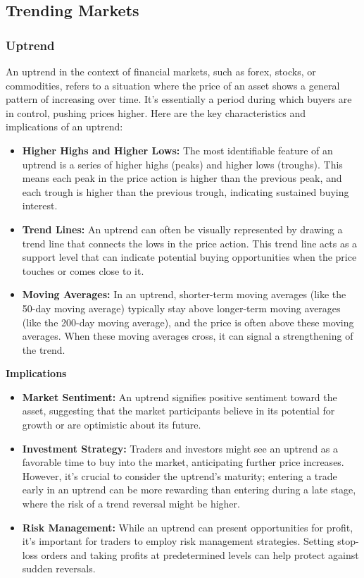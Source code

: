 \documentclass{report}
\begin{document}
    \bigbreak \noindent 
    \subsection{Trending Markets}
    \bigbreak \noindent 
    \subsubsection{Uptrend}
    \bigbreak \noindent 
    An uptrend in the context of financial markets, such as forex, stocks, or commodities, refers to a situation where the price of an asset shows a general pattern of increasing over time. It's essentially a period during which buyers are in control, pushing prices higher. Here are the key characteristics and implications of an uptrend:
    \begin{itemize}
        \item \textbf{Higher Highs and Higher Lows:} The most identifiable feature of an uptrend is a series of higher highs (peaks) and higher lows (troughs). This means each peak in the price action is higher than the previous peak, and each trough is higher than the previous trough, indicating sustained buying interest.
        \item \textbf{Trend Lines:} An uptrend can often be visually represented by drawing a trend line that connects the lows in the price action. This trend line acts as a support level that can indicate potential buying opportunities when the price touches or comes close to it.
        \item \textbf{Moving Averages:} In an uptrend, shorter-term moving averages (like the 50-day moving average) typically stay above longer-term moving averages (like the 200-day moving average), and the price is often above these moving averages. When these moving averages cross, it can signal a strengthening of the trend.
    \end{itemize}
    \bigbreak \noindent 
    \textbf{Implications}
    \begin{itemize}
        \item \textbf{Market Sentiment:} An uptrend signifies positive sentiment toward the asset, suggesting that the market participants believe in its potential for growth or are optimistic about its future.
        \item \textbf{Investment Strategy:} Traders and investors might see an uptrend as a favorable time to buy into the market, anticipating further price increases. However, it's crucial to consider the uptrend's maturity; entering a trade early in an uptrend can be more rewarding than entering during a late stage, where the risk of a trend reversal might be higher.
        \item \textbf{Risk Management:} While an uptrend can present opportunities for profit, it's important for traders to employ risk management strategies. Setting stop-loss orders and taking profits at predetermined levels can help protect against sudden reversals.
    \end{itemize}
    \bigbreak \noindent 
\end{document}
